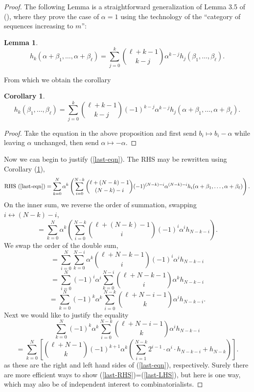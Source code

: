 \documentclass[11pt]{article}
\theoremstyle{plain}
\newtheorem{lemma}[fact]{Lemma}
\newtheorem{corollary}[fact]{Corollary}
\theoremstyle{definition}
\theoremstyle{definition}
\newcounter{equation}
\begin{document}
\begin{proof}
The following Lemma is a straightforward generalization of Lemma 3.5 of (\cite{thesis}), where they prove the case of $\alpha=1$ using the technology of the ``category of sequences increasing to $m$'':
\begin{lemma}\label{lemma-thesis}
\[
h_k(\alpha+\beta_1,\dots,\alpha+\beta_\ell) = \sum_{j=0}^k{\ell+k-1\choose k-j}\alpha^{k-j}h_j(\beta_1,\dots,\beta_\ell).
\]
\end{lemma}
From which we obtain the corollary
\begin{corollary}\label{thesis-corollary}
\[
h_k(\beta_1,\dots,\beta_\ell) = \sum_{j=0}^k{\ell+k-1\choose k-j}(-1)^{k-j}\alpha^{k-j}h_j(\alpha+\beta_1,\dots,\alpha+\beta_\ell).
\]
\end{corollary}
\begin{proof}
Take the equation in the above proposition and first send $b_i\mapsto b_i-\alpha$ while leaving $\alpha$ unchanged, then send $\alpha\mapsto -\alpha$. 
\end{proof}
Now we can begin to justify (\ref{last-eqn}). The RHS may be rewritten using Corollary (\ref{thesis-corollary}),
\[
\text{RHS } (\ref{last-eqn}) = \sum_{k=0}^N\alpha^k \left(\sum_{i=0}^{N-k}  {\ell+(N-k)-1\choose (N-k)-i}(-1)^{(N-k)-i}\alpha^{(N-k)-i}h_i(\alpha+\beta_1,\dots,\alpha+\beta_\ell)      \right).
\]
On the inner sum, we reverse the order of summation, swapping $i \leftrightarrow (N-k)-i$,
$$
= \sum_{k=0}^N\alpha^k \left(\sum_{i=0}^{N-k}  {\ell+(N-k)-1\choose i}(-1)^i\alpha^ih_{N-k-i}      \right).
$$
We swap the order of the double sum,
$$
=\sum_{i=0}^N\sum_{k=0}^{N-i}\alpha^k{\ell+N-k-1\choose i}(-1)^i\alpha^ih_{N-k-i}
$$
$$
=\sum_{i=0}^N(-1)^i\alpha^i\sum_{k=0}^{N-i}{\ell+N-k-1\choose i}\alpha^kh_{N-k-i}
$$
$$
=\sum_{k=0}^N(-1)^k\alpha^k\sum_{i=0}^{N-k}{\ell+N-i-1\choose k}\alpha^ih_{N-k-i}.
$$
Next we would like to justify the equality
\begin{equation}\label{last-RHS}
\sum_{k=0}^N(-1)^k\alpha^k\sum_{i=0}^{N-k}{\ell+N-i-1\choose k}\alpha^ih_{N-k-i}
\end{equation}
\begin{equation}\label{last-LHS}
=\sum_{k=0}^N\left[{\ell+N-1\choose k}(-1)^{k+1}\alpha^k\left(\sum_{i=1}^{N-k}2^{i-1}\cdot \alpha^i\cdot h_{N-k-i}+h_{N-k}\right)\right].
\end{equation}
as these are the right and left hand sides of (\ref{last-eqn}), respectively. Surely there are more efficient ways to show (\ref{last-RHS})=(\ref{last-LHS}), but here is one way, which may also be of independent interest to combinatorialists.


\end{proof}
\end{document}
